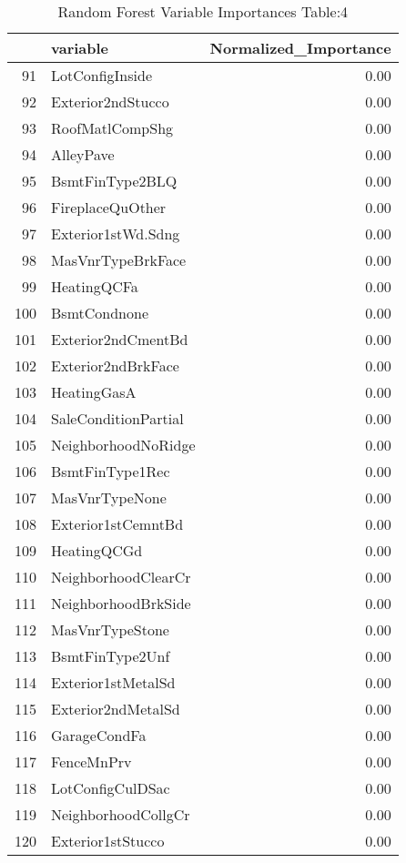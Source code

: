 \begin{table}[ht]
\centering
\begin{tabular}{rlr}
  \hline
 & variable & Normalized\_Importance \\ 
  \hline
91 & LotConfigInside & 0.00 \\ 
  92 & Exterior2ndStucco & 0.00 \\ 
  93 & RoofMatlCompShg & 0.00 \\ 
  94 & AlleyPave & 0.00 \\ 
  95 & BsmtFinType2BLQ & 0.00 \\ 
  96 & FireplaceQuOther & 0.00 \\ 
  97 & Exterior1stWd.Sdng & 0.00 \\ 
  98 & MasVnrTypeBrkFace & 0.00 \\ 
  99 & HeatingQCFa & 0.00 \\ 
  100 & BsmtCondnone & 0.00 \\ 
  101 & Exterior2ndCmentBd & 0.00 \\ 
  102 & Exterior2ndBrkFace & 0.00 \\ 
  103 & HeatingGasA & 0.00 \\ 
  104 & SaleConditionPartial & 0.00 \\ 
  105 & NeighborhoodNoRidge & 0.00 \\ 
  106 & BsmtFinType1Rec & 0.00 \\ 
  107 & MasVnrTypeNone & 0.00 \\ 
  108 & Exterior1stCemntBd & 0.00 \\ 
  109 & HeatingQCGd & 0.00 \\ 
  110 & NeighborhoodClearCr & 0.00 \\ 
  111 & NeighborhoodBrkSide & 0.00 \\ 
  112 & MasVnrTypeStone & 0.00 \\ 
  113 & BsmtFinType2Unf & 0.00 \\ 
  114 & Exterior1stMetalSd & 0.00 \\ 
  115 & Exterior2ndMetalSd & 0.00 \\ 
  116 & GarageCondFa & 0.00 \\ 
  117 & FenceMnPrv & 0.00 \\ 
  118 & LotConfigCulDSac & 0.00 \\ 
  119 & NeighborhoodCollgCr & 0.00 \\ 
  120 & Exterior1stStucco & 0.00 \\ 
   \hline
\end{tabular}
\caption{Random Forest Variable Importances Table:4} 
\label{tab:importance4}
\end{table}

